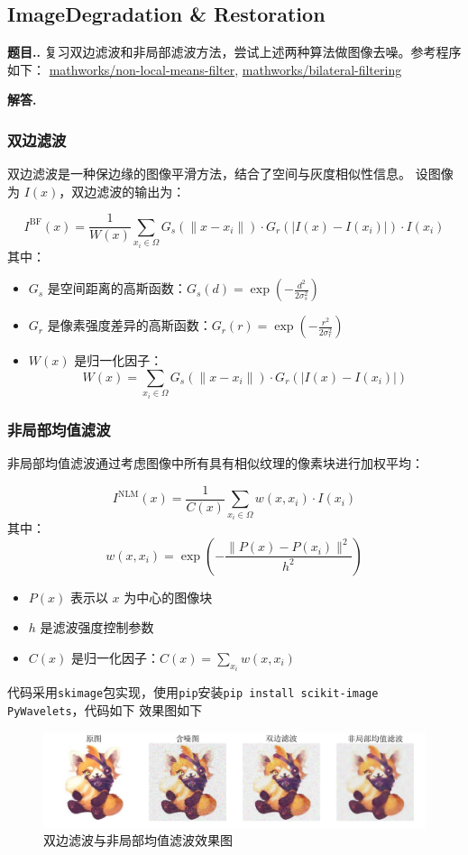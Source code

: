 \documentclass[12pt, a4paper, oneside]{ctexart}
\numberwithin{equation}{section}  %
\newcounter{problem}[subsection]  %
\newenvironment{problem}[1][]{\stepcounter{problem}\par\noindent\textbf{题目\thesubsection.\arabic{problem}. #1}}{\smallskip\par}
\newenvironment{solution}[1][]{\par\noindent\textbf{#1解答. }}{\smallskip\par}  %
\begin{document}
\subsection{ImageDegradation \& Restoration}
\begin{problem}
复习双边滤波和非局部滤波方法，尝试上述两种算法做图像去噪。参考程序如下：
\href{http://www.mathworks.com/matlabcentral/fileexchange/13176-non-local-means-filter}{mathworks/non-local-means-filter},
\href{http://www.mathworks.com/matlabcentral/fileexchange/12191-bilateral-filtering}{mathworks/bilateral-filtering}
\end{problem}
\begin{solution}
\subsubsection*{双边滤波}
双边滤波是一种保边缘的图像平滑方法，结合了空间与灰度相似性信息。
设图像为 $I(x)$，双边滤波的输出为：

\[
I^\text{BF}(x) = \frac{1}{W(x)} \sum_{x_i \in \Omega} G_s(\|x - x_i\|) \cdot G_r(|I(x) - I(x_i)|) \cdot I(x_i)
\]
其中：
\begin{itemize}
  \item $G_s$ 是空间距离的高斯函数：$G_s(d) = \exp\left( -\frac{d^2}{2\sigma_s^2} \right)$
  \item $G_r$ 是像素强度差异的高斯函数：$G_r(r) = \exp\left( -\frac{r^2}{2\sigma_r^2} \right)$
  \item $W(x)$ 是归一化因子：
  \[
  W(x) = \sum_{x_i \in \Omega} G_s(\|x - x_i\|) \cdot G_r(|I(x) - I(x_i)|)
  \]
\end{itemize}

\subsubsection*{非局部均值滤波}
非局部均值滤波通过考虑图像中所有具有相似纹理的像素块进行加权平均：

\[
I^\text{NLM}(x) = \frac{1}{C(x)} \sum_{x_i \in \Omega} w(x, x_i) \cdot I(x_i)
\]
其中：
\[
w(x, x_i) = \exp\left( -\frac{\|P(x) - P(x_i)\|^2}{h^2} \right)
\]

\begin{itemize}
  \item $P(x)$ 表示以 $x$ 为中心的图像块
  \item $h$ 是滤波强度控制参数
  \item $C(x)$ 是归一化因子：$C(x) = \sum_{x_i} w(x, x_i)$
\end{itemize}

代码采用\texttt{skimage}包实现，使用\texttt{pip}安装\texttt{pip install scikit-image PyWavelets}，代码如下
效果图如下
\begin{figure}[htbp]
  \centering
  \includegraphics[width=\linewidth]{./coding/5.2.1_results/output.png}
  \caption{双边滤波与非局部均值滤波效果图}
\end{figure}
\end{solution}
\end{document}
